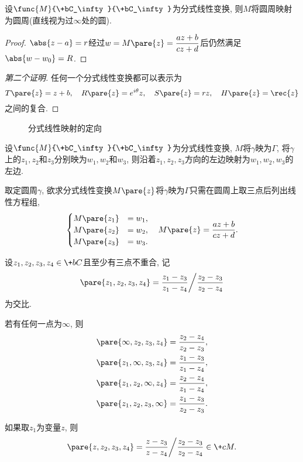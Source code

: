 \documentclass{ctexart}
\begin{document}
\begin{theorem}
    设$\func{M}{\+bC_\infty}{\+bC_\infty}$为分式线性变换, 则$M$将圆周映射为圆周(直线视为过$\infty$处的圆).
\end{theorem}
\begin{proof}
    $\abs{z-a} = r$经过$\displaystyle w=M\pare{z} = \frac{az+b}{cz+d}$后仍然满足$\abs{w-w_0} = R$.
\end{proof}
\begin{proof}[第二个证明]
    任何一个分式线性变换都可以表示为
    \[ T\pare{z} = z+b,\quad R\pare{z} = e^{i\theta}z,\quad S\pare{z} = rz,\quad H\pare{z} = \rec{z} \]
    之间的复合.
\end{proof}
\begin{figure}[ht]
    \centering
    \caption{分式线性映射的定向}
\end{figure}
\begin{remark}
    设$\func{M}{\+bC_\infty}{\+bC_\infty}$为分式线性变换, $M$将$\gamma$映为$\Gamma$, 将$\gamma$上的$z_1,z_2$和$z_3$分别映为$w_1, w_2$和$w_3$, 则沿着$z_1, z_2, z_3$方向的左边映射为$w_1,w_2,w_3$的左边.
\end{remark}
取定圆周$\gamma$, 欲求分式线性变换$M\pare{z}$将$\gamma$映为$\Gamma$只需在圆周上取三点后列出线性方程组,
\[ \begin{cases}
    M\pare{z_1} &= w_1, \\
    M\pare{z_2} &= w_2, \\
    M\pare{z_3} &= w_3.
\end{cases}\quad M\pare{z} = \frac{az+b}{cz+d}. \]
\begin{definition}
    设$z_1,z_2,z_3,z_4\in \+bC$且至少有三点不重合, 记
    \[ \pare{z_1,z_2,z_3,z_4} = \frac{z_1-z_3}{z_1-z_4} \bigg/ \frac{z_2-z_3}{z_2-z_4} \]
    为交比.
\end{definition}
\begin{remark}
    若有任何一点为$\infty$, 则
    \begin{align*}
        \pare{\infty, z_2,z_3,z_4} &= \frac{z_2-z_4}{z_2-z_3}, \\
        \pare{z_1,\infty, z_3,z_4} &= \frac{z_1-z_3}{z_1-z_4}, \\
        \pare{z_1,z_2,\infty, z_4} &= \frac{z_2-z_4}{z_1-z_4}, \\
        \pare{z_1,z_2,z_3, \infty} &= \frac{z_1-z_3}{z_2-z_3}.
    \end{align*}
\end{remark}
如果取$z_1$为变量$z$, 则
\[ \pare{z, z_2, z_3, z_4} = \frac{z-z_3}{z-z_4}\bigg/ \frac{z_2-z_3}{z_2-z_4}\in \+cM. \]
\end{document}
